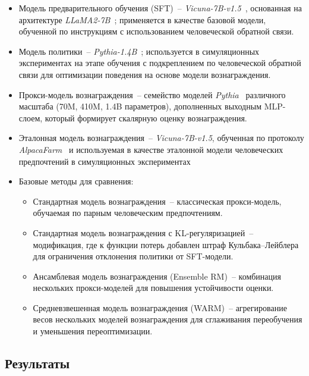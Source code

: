 \begin{itemize}
    \item Модель предварительного обучения (SFT)~-- \emph{Vicuna-7B-v1.5}~\cite{vicuna2023}, основанная на архитектуре \emph{LLaMA2-7B}~\cite{llama2_2023}; применяется в качестве базовой модели, обученной по инструкциям с использованием человеческой обратной связи.
    
    \item Модель политики~-- \emph{Pythia-1.4B}~\cite{bai2022helpfulharmless}; используется в симуляционных экспериментах на этапе обучения с подкреплением по человеческой обратной связи для оптимизации поведения на основе модели вознаграждения.
    
    \item Прокси-модель вознаграждения~-- семейство моделей \emph{Pythia}~\cite{bai2022helpfulharmless} различного масштаба (70M, 410M, 1.4B параметров), дополненных выходным MLP-слоем, который формирует скалярную оценку вознаграждения.
    
    \item Эталонная модель вознаграждения~-- \emph{Vicuna-7B-v1.5}, обученная по протоколу \emph{AlpacaFarm}~\cite{dubois2023alpacafarm} и используемая в качестве эталонной модели человеческих предпочтений в симуляционных экспериментах
    
    \item Базовые методы для сравнения:
    \begin{itemize}
        \item Стандартная модель вознаграждения~-- классическая прокси-модель, обучаемая по парным человеческим предпочтениям.  
        \item Стандартная модель вознаграждения с KL-регуляризацией~-- модификация, где к функции потерь добавлен штраф Кульбака–Лейблера для ограничения отклонения политики от SFT-модели.  
        \item Ансамблевая модель вознаграждения (Ensemble RM)~-- комбинация нескольких прокси-моделей для повышения устойчивости оценки.  
        \item Средневзвешенная модель вознаграждения (WARM)~-- агрегирование весов нескольких моделей вознаграждения для сглаживания переобучения и уменьшения переоптимизации.  
    \end{itemize}
\end{itemize}

\subsection{Результаты}

